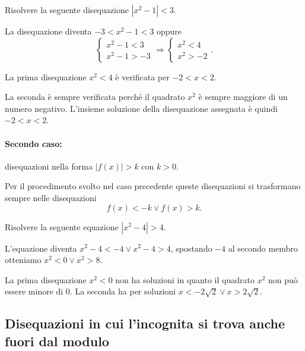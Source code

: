 \begin{exrig}
\begin{esempio}
Risolvere la seguente disequazione $\left|x^2-1\right|<3$.

La disequazione diventa $-3<x^2-1<3$ oppure 
\[\left\{\begin{array}{l}{x^2-1<3}\\{x^2-1>-3}\end{array}\right.\Rightarrow \left\{\begin{array}{l}{x^2<4}\\{x^2>-2}\end{array}\right..\]

La prima disequazione $x^2<4$ è verificata per $-2<x<2$.

La seconda è sempre verificata perché il quadrato $x^2$ è sempre maggiore di un numero negativo.
L'insieme soluzione della disequazione assegnata è quindi $-2<x<2$.

\end{esempio}
\end{exrig}

\paragraph{Secondo caso:} disequazioni nella forma $\left|f(x)\right|>k$ con $ k>0 $.

Per il procedimento svolto nel caso precedente queste disequazioni si trasformano sempre nelle disequazioni \[ f(x)<-k\vee f(x)>k. \]

\begin{exrig}
\begin{esempio}
Risolvere la seguente equazione $\left|x^2-4\right|>4$.

L'equazione diventa $x^2-4<-4\vee x^2-4>4$, spostando $ -4 $ al secondo membro otteniamo $x^2<0\vee x^2>8$.

La prima disequazione $x^2<0$ non ha soluzioni in quanto il quadrato $x^2$ non può essere minore di 0.
La seconda ha per soluzioni $x<-2\sqrt 2\vee x>2\sqrt 2$.
\end{esempio}
\end{exrig}

\subsection{Disequazioni in cui l'incognita si trova anche fuori dal modulo}

